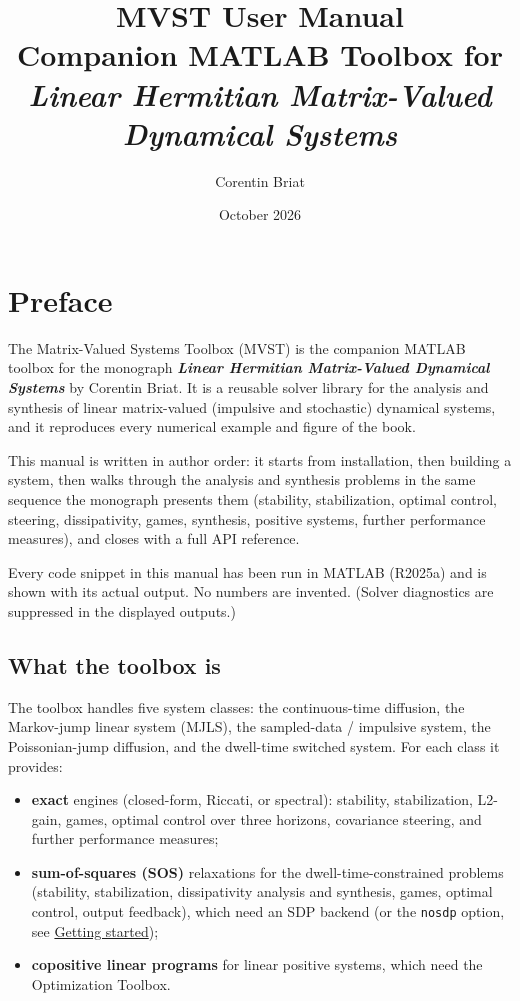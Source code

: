 \documentclass[11pt,oneside]{report}
\title{\vspace{-1cm}\Huge\textbf{MVST User Manual}\\[0.6em]
       \large Companion MATLAB Toolbox for\\
       \emph{Linear Hermitian Matrix-Valued Dynamical Systems}}
\author{Corentin Briat}
\date{October 2026}
\newcommand{\code}[1]{\texttt{#1}}
\providecommand{\tightlist}{\setlength{\itemsep}{0pt}\setlength{\parskip}{0pt}}
\begin{document}
\maketitle
\tableofcontents

\chapter*{Preface}
\label{chap:index}

The Matrix-Valued Systems Toolbox (MVST) is the companion MATLAB toolbox for the monograph \textbf{\emph{Linear Hermitian
Matrix-Valued Dynamical Systems}} by Corentin Briat. It is a reusable solver
library for the analysis and synthesis of linear matrix-valued (impulsive and
stochastic) dynamical systems, and it reproduces every numerical example and
figure of the book.

This manual is written in author order: it starts from installation, then
building a system, then walks through the analysis and synthesis problems in
the same sequence the monograph presents them (stability, stabilization,
optimal control, steering, dissipativity, games, synthesis, positive systems,
further performance measures), and closes with a full API
reference.

Every code snippet in this manual has been run in MATLAB (R2025a) and is shown
with its actual output. No numbers are invented. (Solver diagnostics are
suppressed in the displayed outputs.)

\hypertarget{what-the-toolbox-is}{%
\section*{What the toolbox is}\label{what-the-toolbox-is}}

The toolbox handles five system classes: the continuous-time diffusion, the
Markov-jump linear system (MJLS), the sampled-data / impulsive system, the
Poissonian-jump diffusion, and the dwell-time switched system. For each class
it provides:

\begin{itemize}
\tightlist
\item
  \textbf{exact} engines (closed-form, Riccati, or spectral): stability,
  stabilization, L2-gain, games, optimal control over three horizons,
  covariance steering, and further performance measures;
\item
  \textbf{sum-of-squares (SOS)} relaxations for the dwell-time-constrained problems
  (stability, stabilization, dissipativity analysis and synthesis, games,
  optimal control, output feedback), which need an SDP backend (or the \code{nosdp} option, see \protect\hyperlink{chap:01-getting-started}{Getting started});
\item
  \textbf{copositive linear programs} for linear positive systems, which need the
  Optimization Toolbox.
\end{itemize}
\end{document}
